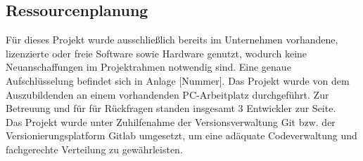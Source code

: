\subsection{Ressourcenplanung}
    Für dieses Projekt wurde ausschließlich bereits im Unternehmen vorhandene, lizenzierte oder freie Software sowie Hardware genutzt, wodurch keine Neuanschaffungen im Projektrahmen notwendig sind. Eine genaue Aufschlüsselung befindet sich in Anlage [Nummer]. Das Projekt wurde von dem Auszubildenden an einem vorhandenden PC-Arbeitplatz durchgeführt. Zur Betreuung und für für Rückfragen standen insgesamt 3 Entwickler zur Seite.\\
    Das Projekt wurde unter Zuhilfenahme der Versionsverwaltung Git bzw. der Versionierungsplatform Gitlab umgesetzt, um eine adäquate Codeverwaltung und fachgerechte Verteilung zu gewährleisten.

\vfill